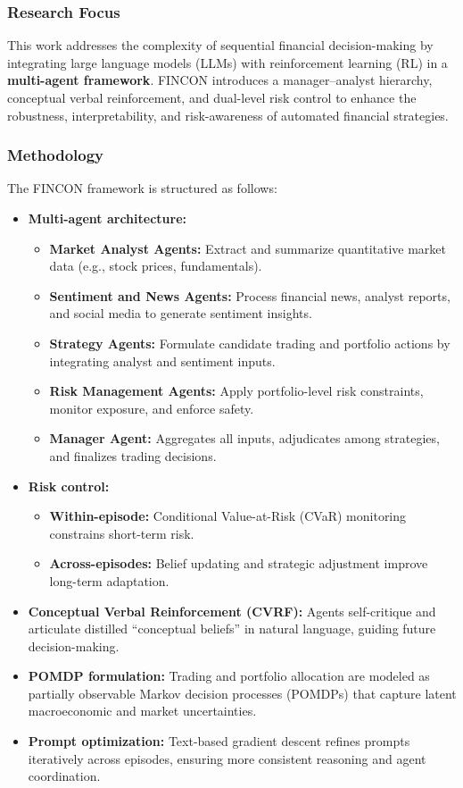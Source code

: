 \documentclass[12pt,a4paper]{report}
\begin{document}
\subsubsection{Research Focus}
This work addresses the complexity of sequential financial decision-making by integrating large language models (LLMs) with reinforcement learning (RL) in a \textbf{multi-agent framework}. FINCON introduces a manager–analyst hierarchy, conceptual verbal reinforcement, and dual-level risk control to enhance the robustness, interpretability, and risk-awareness of automated financial strategies.

\subsubsection{Methodology}
The FINCON framework is structured as follows:
\begin{itemize}
    \item \textbf{Multi-agent architecture:}  
    \begin{itemize}
        \item \textbf{Market Analyst Agents:} Extract and summarize quantitative market data (e.g., stock prices, fundamentals).  
        \item \textbf{Sentiment and News Agents:} Process financial news, analyst reports, and social media to generate sentiment insights.  
        \item \textbf{Strategy Agents:} Formulate candidate trading and portfolio actions by integrating analyst and sentiment inputs.  
        \item \textbf{Risk Management Agents:} Apply portfolio-level risk constraints, monitor exposure, and enforce safety.  
        \item \textbf{Manager Agent:} Aggregates all inputs, adjudicates among strategies, and finalizes trading decisions.  
    \end{itemize}
    \item \textbf{Risk control:}  
    \begin{itemize}
        \item \textbf{Within-episode:} Conditional Value-at-Risk (CVaR) monitoring constrains short-term risk.  
        \item \textbf{Across-episodes:} Belief updating and strategic adjustment improve long-term adaptation.  
    \end{itemize}
    \item \textbf{Conceptual Verbal Reinforcement (CVRF):} Agents self-critique and articulate distilled “conceptual beliefs” in natural language, guiding future decision-making.  
    \item \textbf{POMDP formulation:} Trading and portfolio allocation are modeled as partially observable Markov decision processes (POMDPs) that capture latent macroeconomic and market uncertainties.  
    \item \textbf{Prompt optimization:} Text-based gradient descent refines prompts iteratively across episodes, ensuring more consistent reasoning and agent coordination.  
\end{itemize}
\end{document}
